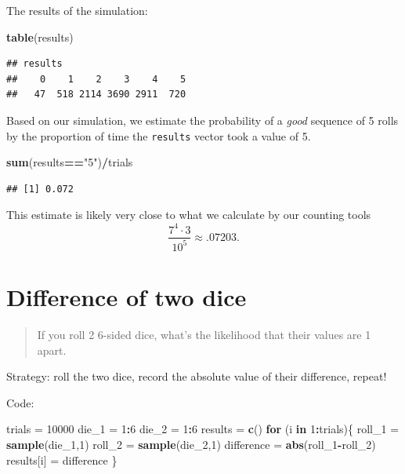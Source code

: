 \documentclass[
]{book}
\newenvironment{Shaded}{\begin{snugshade}}{\end{snugshade}}
\newcommand{\ControlFlowTok}[1]{\textcolor[rgb]{0.13,0.29,0.53}{\textbf{#1}}}
\newcommand{\DecValTok}[1]{\textcolor[rgb]{0.00,0.00,0.81}{#1}}
\newcommand{\FunctionTok}[1]{\textcolor[rgb]{0.13,0.29,0.53}{\textbf{#1}}}
\newcommand{\NormalTok}[1]{#1}
\newcommand{\OtherTok}[1]{\textcolor[rgb]{0.56,0.35,0.01}{#1}}
\newcommand{\SpecialCharTok}[1]{\textcolor[rgb]{0.81,0.36,0.00}{\textbf{#1}}}
\newcommand{\StringTok}[1]{\textcolor[rgb]{0.31,0.60,0.02}{#1}}
\theoremstyle{definition}
\theoremstyle{definition}
\theoremstyle{definition}
\theoremstyle{definition}
\theoremstyle{remark}
\begin{document}
The results of the simulation:

\begin{Shaded}
\begin{Highlighting}[]
\FunctionTok{table}\NormalTok{(results)}
\end{Highlighting}
\end{Shaded}

\begin{verbatim}
## results
##    0    1    2    3    4    5 
##   47  518 2114 3690 2911  720
\end{verbatim}

Based on our simulation, we estimate the probability of a \emph{good} sequence of 5 rolls by the proportion of time the \texttt{results} vector took a value of 5.

\begin{Shaded}
\begin{Highlighting}[]
\FunctionTok{sum}\NormalTok{(results}\SpecialCharTok{==}\StringTok{"5"}\NormalTok{)}\SpecialCharTok{/}\NormalTok{trials}
\end{Highlighting}
\end{Shaded}

\begin{verbatim}
## [1] 0.072
\end{verbatim}

This estimate is likely very close to what we calculate by our counting tools \[\frac{7^4\cdot 3}{10^5} \approx .07203.\]

\section{Difference of two dice}\label{diff-2dice-R}

\begin{quote}
If you roll 2 6-sided dice, what's the likelihood that their values are 1 apart.
\end{quote}

Strategy: roll the two dice, record the absolute value of their difference, repeat!

Code:

\begin{Shaded}
\begin{Highlighting}[]
\NormalTok{trials }\OtherTok{=} \DecValTok{10000}
\NormalTok{die\_1 }\OtherTok{=} \DecValTok{1}\SpecialCharTok{:}\DecValTok{6}
\NormalTok{die\_2 }\OtherTok{=} \DecValTok{1}\SpecialCharTok{:}\DecValTok{6}
\NormalTok{results }\OtherTok{=} \FunctionTok{c}\NormalTok{()}
\ControlFlowTok{for}\NormalTok{ (i }\ControlFlowTok{in} \DecValTok{1}\SpecialCharTok{:}\NormalTok{trials)\{}
\NormalTok{  roll\_1 }\OtherTok{=} \FunctionTok{sample}\NormalTok{(die\_1,}\DecValTok{1}\NormalTok{)}
\NormalTok{  roll\_2 }\OtherTok{=} \FunctionTok{sample}\NormalTok{(die\_2,}\DecValTok{1}\NormalTok{)}
\NormalTok{  difference }\OtherTok{=} \FunctionTok{abs}\NormalTok{(roll\_1}\SpecialCharTok{{-}}\NormalTok{roll\_2)}
\NormalTok{  results[i] }\OtherTok{=}\NormalTok{ difference}
\NormalTok{\}}
\end{Highlighting}
\end{Shaded}
\end{document}
